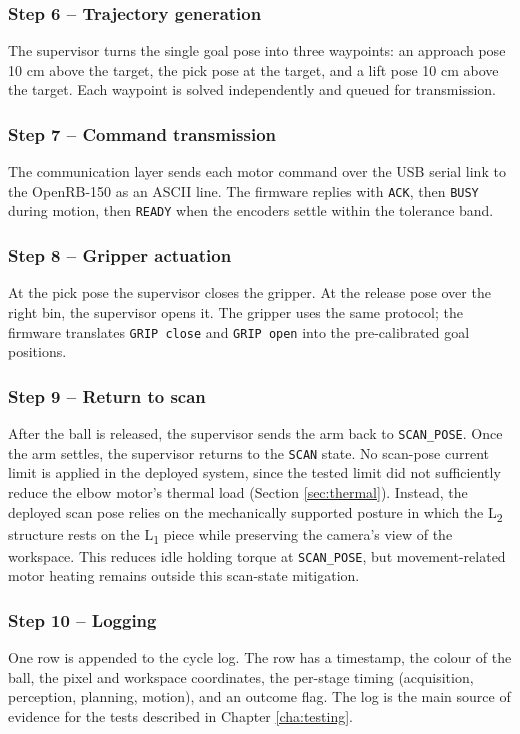 \subsubsection*{Step 6 -- Trajectory generation}
The supervisor turns the single goal pose into three waypoints: an
approach pose 10 cm above the target, the pick pose at the target,
and a lift pose 10 cm above the target. Each waypoint is solved
independently and queued for transmission.
\subsubsection*{Step 7 -- Command transmission}
The communication layer sends each motor command over the USB serial
link to the OpenRB-150 as an ASCII line. The firmware replies with
\texttt{ACK}, then \texttt{BUSY} during motion, then \texttt{READY}
when the encoders settle within the tolerance band.
\subsubsection*{Step 8 -- Gripper actuation}
At the pick pose the supervisor closes the gripper. At the release
pose over the right bin, the supervisor opens it. The gripper uses
the same protocol; the firmware translates \texttt{GRIP close} and
\texttt{GRIP open} into the pre-calibrated goal positions.
\subsubsection*{Step 9 -- Return to scan}
After the ball is released, the supervisor sends the arm back to
\texttt{SCAN\_POSE}. Once the arm settles, the supervisor returns to
the \texttt{SCAN} state. No scan-pose current limit is applied in the
deployed system, since the tested limit did not sufficiently reduce
the elbow motor's thermal load (Section \ref{sec:thermal}). Instead,
the deployed scan pose relies on the mechanically supported posture in
which the L\textsubscript{2} structure rests on the L\textsubscript{1}
piece while preserving the camera's view of the workspace. This reduces
idle holding torque at \texttt{SCAN\_POSE}, but movement-related motor
heating remains outside this scan-state mitigation.
\subsubsection*{Step 10 -- Logging}
One row is appended to the cycle log. The row has a timestamp, the
colour of the ball, the pixel and workspace coordinates, the per-stage
timing (acquisition, perception, planning, motion), and an outcome
flag. The log is the main source of evidence for the tests described
in Chapter \ref{cha:testing}.
